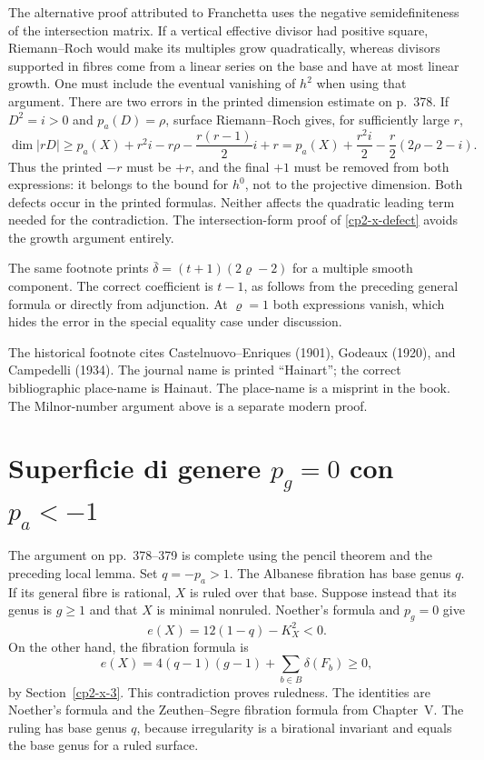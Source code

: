 The alternative proof attributed to Franchetta uses the negative semidefiniteness of the intersection matrix. If a vertical effective divisor had positive square, Riemann--Roch would make its multiples grow quadratically, whereas divisors supported in fibres come from a linear series on the base and have at most linear growth. One must include the eventual vanishing of $h^2$ when using that argument. There are two errors in the printed dimension estimate on p.~378. If $D^2=i>0$ and $p_a(D)=\rho$, surface Riemann--Roch gives, for sufficiently large $r$,
\[
 \dim|rD|\geq p_a(X)+r^2i-r\rho-\frac{r(r-1)}2i+r
 =p_a(X)+\frac{r^2i}{2}-\frac r2(2\rho-2-i).
\]
Thus the printed $-r$ must be $+r$, and the final $+1$ must be removed from both expressions: it belongs to the bound for $h^0$, not to the projective dimension. Both defects occur in the printed formulas. Neither affects the quadratic leading term needed for the contradiction. The intersection-form proof of \eqref{cp2-x-defect} avoids the growth argument entirely.

The same footnote prints $\bar\delta=(t+1)(2\varrho-2)$ for a multiple smooth component. The correct coefficient is $t-1$, as follows from the preceding general formula or directly from adjunction. At $\varrho=1$ both expressions vanish, which hides the error in the special equality case under discussion.

The historical footnote cites Castelnuovo--Enriques (1901), Godeaux (1920), and Campedelli (1934). The journal name is printed ``Hainart''; the correct bibliographic place-name is Hainaut. The place-name is a misprint in the book. The Milnor-number argument above is a separate modern proof.

\section{Superficie di genere \texorpdfstring{$p_g=0$}{pg=0} con \texorpdfstring{$p_a<-1$}{pa<−1}}
\label{cp2-x-4}

The argument on pp.~378--379 is complete using the pencil theorem and the preceding local lemma. Set $q=-p_a>1$. The Albanese fibration has base genus $q$. If its general fibre is rational, $X$ is ruled over that base. Suppose instead that its genus is $g\geq1$ and that $X$ is minimal nonruled. Noether's formula and $p_g=0$ give
\[
 e(X)=12(1-q)-K_X^2<0.
\]
On the other hand, the fibration formula is
\[
 e(X)=4(q-1)(g-1)+\sum_{b\in B}\delta(F_b)\geq0,
\]
by Section~\ref{cp2-x-3}. This contradiction proves ruledness. The identities are Noether's formula and the Zeuthen--Segre fibration formula from Chapter~V. The ruling has base genus $q$, because irregularity is a birational invariant and equals the base genus for a ruled surface.

